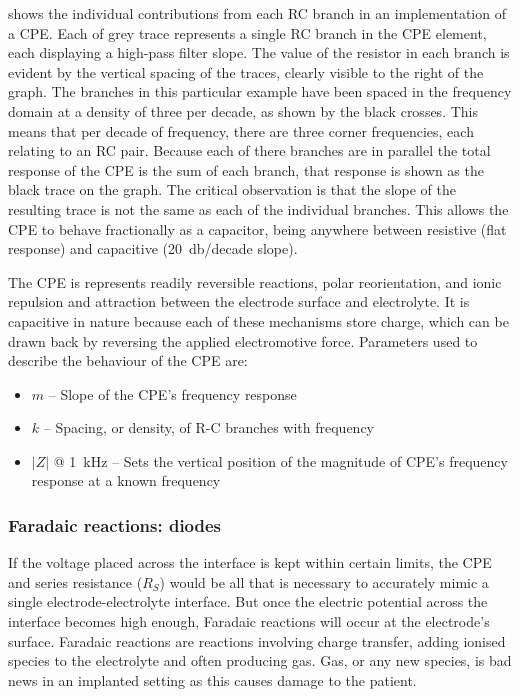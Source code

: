        shows the individual contributions from each RC branch in an implementation of a CPE.
      Each of grey trace represents a single RC branch in the CPE element, each displaying a high-pass filter slope.
      The value of the resistor in each branch is evident by the vertical spacing of the traces, clearly visible to the right of the graph.
      The branches in this particular example have been spaced in the frequency domain at a density of three per decade, as shown by the black crosses.
      This means that per decade of frequency, there are three corner frequencies, each relating to an RC pair.
      Because each of there branches are in parallel the total response of the CPE is the sum of each branch, that response is shown as the black trace on the graph.
      The critical observation is that the slope of the resulting trace is not the same as each of the individual branches.
      This allows the CPE to behave fractionally as a capacitor, being anywhere between resistive (flat response) and capacitive (\SI{20}{\decibel}/decade slope).

      The CPE is represents readily reversible reactions, polar reorientation, and ionic repulsion and attraction between the electrode surface and electrolyte.
      It is capacitive in nature because each of these mechanisms store charge, which can be drawn back by reversing the applied electromotive force.
      Parameters used to describe the behaviour of the CPE are:
      \begin{itemize}
        \item $m$ -- Slope of the CPE's frequency response
        \item $k$ -- Spacing, or density, of R-C branches with frequency
        \item $|Z|$ @ \SI{1}{\kilo\hertz} -- Sets the vertical position of the magnitude of CPE's frequency response at a known frequency
      \end{itemize}


    \subsubsection{Faradaic reactions: diodes}
      If the voltage placed across the interface is kept within certain limits, the CPE and series resistance ($R_{S}$) would be all that is necessary to accurately mimic a single electrode-electrolyte interface.
      But once the electric potential across the interface becomes high enough, Faradaic reactions will occur at the electrode's surface.
      Faradaic reactions are reactions involving charge transfer, adding ionised species to the electrolyte and often producing gas.
      Gas, or any new species, is bad news in an implanted setting as this causes damage to the patient.

